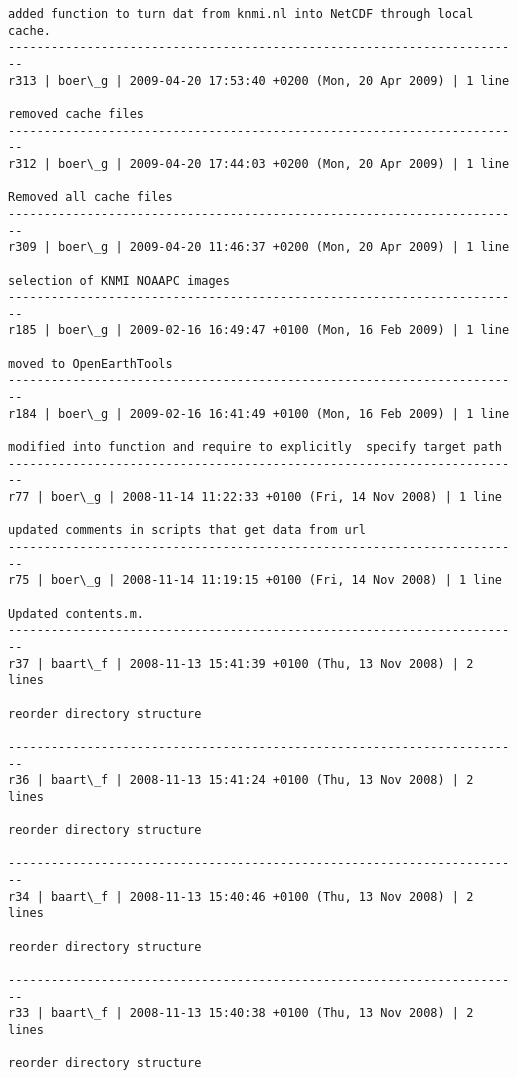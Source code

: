 \documentclass[9]{report}
\begin{document}
\begin{description}
\begin{verbatim}
added function to turn dat from knmi.nl into NetCDF through local cache.
------------------------------------------------------------------------
r313 | boer\_g | 2009-04-20 17:53:40 +0200 (Mon, 20 Apr 2009) | 1 line

removed cache files
------------------------------------------------------------------------
r312 | boer\_g | 2009-04-20 17:44:03 +0200 (Mon, 20 Apr 2009) | 1 line

Removed all cache files
------------------------------------------------------------------------
r309 | boer\_g | 2009-04-20 11:46:37 +0200 (Mon, 20 Apr 2009) | 1 line

selection of KNMI NOAAPC images
------------------------------------------------------------------------
r185 | boer\_g | 2009-02-16 16:49:47 +0100 (Mon, 16 Feb 2009) | 1 line

moved to OpenEarthTools
------------------------------------------------------------------------
r184 | boer\_g | 2009-02-16 16:41:49 +0100 (Mon, 16 Feb 2009) | 1 line

modified into function and require to explicitly  specify target path
------------------------------------------------------------------------
r77 | boer\_g | 2008-11-14 11:22:33 +0100 (Fri, 14 Nov 2008) | 1 line

updated comments in scripts that get data from url
------------------------------------------------------------------------
r75 | boer\_g | 2008-11-14 11:19:15 +0100 (Fri, 14 Nov 2008) | 1 line

Updated contents.m.
------------------------------------------------------------------------
r37 | baart\_f | 2008-11-13 15:41:39 +0100 (Thu, 13 Nov 2008) | 2 lines

reorder directory structure

------------------------------------------------------------------------
r36 | baart\_f | 2008-11-13 15:41:24 +0100 (Thu, 13 Nov 2008) | 2 lines

reorder directory structure

------------------------------------------------------------------------
r34 | baart\_f | 2008-11-13 15:40:46 +0100 (Thu, 13 Nov 2008) | 2 lines

reorder directory structure

------------------------------------------------------------------------
r33 | baart\_f | 2008-11-13 15:40:38 +0100 (Thu, 13 Nov 2008) | 2 lines

reorder directory structure


\end{verbatim}
\end{description}
\end{document}
